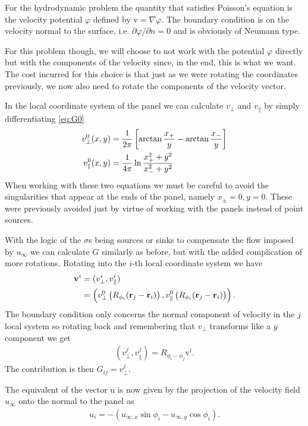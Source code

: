 \documentclass[10pt,a4paper,twocolumn]{article}
\renewcommand{\vec}[1]{\bm{\mathrm{#1}}}
\begin{document}
For the hydrodynamic problem the quantity that satisfies Poisson's equation is the velocity potential $\varphi$ defined by $\vec{v} = \nabla \varphi$. The boundary condition is on the velocity normal to the surface, i.e. $\partial \varphi / \partial n = 0$ and is obviously of Neumann type.

For this problem though, we will choose to not work with the potential $\varphi$ directly but with the components of the velocity since, in the end, this is what we want. The cost incurred for this choice is that just as we were rotating the coordinates previously, we now also need to rotate the components of the velocity vector.

In the local coordinate system of the panel we can calculate $v_{\perp}$ and $v_{\parallel}$ by simply differentiating \cref{eq:G0}
%
\begin{align}
    v_{\perp}^{0}(x,y) &= \frac{1}{2 \pi} \left[ \arctan\frac{x_+}{y} - \arctan\frac{x_-}{y}\right] \notag\\
    v_{\parallel}^{0}(x,y) &= \frac{1}{4 \pi} \ln \frac{x_+^2 + y^2}{x_-^2 + y^2}
\end{align}
%
When working with these two equations we must be careful to avoid the singularities that appear at the ends of the panel, namely $x_{\pm}=0,y=0$. These were previously avoided just by virtue of working with the panels instead of point sources.

With the logic of the $\sigma$s being sources or sinks to compensate the flow imposed by $u_{\infty}$ we can calculate $G$ similarly as before, but with the added complication of more rotations. Rotating into the $i$-th local coordinate system we have
%
\begin{align}
    \vec{v}^i &= (v_{\perp}^i, v_{\parallel}^i) \\
    &= \left(v_{\perp}^{0}\left(R_{\phi_i}(\vec{r}_j - \vec{r}_i)\right), v_{\parallel}^{0}\left(R_{\phi_i}(\vec{r}_j - \vec{r}_i)\right)\right). \notag
\end{align}
%
The boundary condition only concerns the normal component of velocity in the $j$ local system so rotating back and remembering that $v_{\perp}$ transforms like a $y$ component we get
%
\begin{align}
    (v_{\perp}^j, v_{\parallel}^j) = R_{\phi_i - \phi_j} \vec{v}^i.
\end{align}
%
The contribution is then $G_{ij} = v_{\perp}^j$.

The equivalent of the vector $\vec{u}$ is now given by the projection of the velocity field $u_\infty$ onto the normal to the panel as
%
\begin{align}
    u_i = - (u_{\infty,x} \sin \phi_i - u_{\infty,y} \cos \phi_i).
\end{align}
\end{document}
